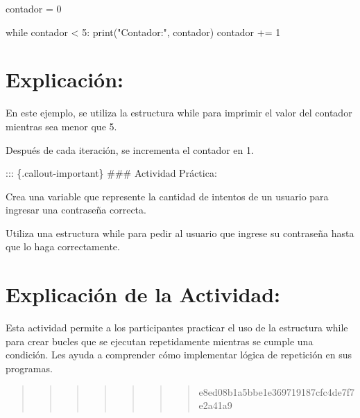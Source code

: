 \documentclass[
  a4paper,
  DIV=11,
  numbers=noendperiod,
  onepage,
  openany]{scrreprt}
\newenvironment{Shaded}{\begin{snugshade}}{\end{snugshade}}
\newcommand{\BuiltInTok}[1]{\textcolor[rgb]{0.00,0.23,0.31}{#1}}
\newcommand{\ControlFlowTok}[1]{\textcolor[rgb]{0.00,0.23,0.31}{#1}}
\newcommand{\DecValTok}[1]{\textcolor[rgb]{0.68,0.00,0.00}{#1}}
\newcommand{\NormalTok}[1]{\textcolor[rgb]{0.00,0.23,0.31}{#1}}
\newcommand{\OperatorTok}[1]{\textcolor[rgb]{0.37,0.37,0.37}{#1}}
\newcommand{\StringTok}[1]{\textcolor[rgb]{0.13,0.47,0.30}{#1}}
\begin{document}
\begin{Shaded}
\begin{Highlighting}[]
\NormalTok{contador }\OperatorTok{=} \DecValTok{0}

\ControlFlowTok{while}\NormalTok{ contador }\OperatorTok{\textless{}} \DecValTok{5}\NormalTok{:}
    \BuiltInTok{print}\NormalTok{(}\StringTok{"Contador:"}\NormalTok{, contador)}
\NormalTok{    contador }\OperatorTok{+=} \DecValTok{1}
\end{Highlighting}
\end{Shaded}

\hypertarget{explicaciuxf3n-37}{%
\section{Explicación:}\label{explicaciuxf3n-37}}

En este ejemplo, se utiliza la estructura while para imprimir el valor
del contador mientras sea menor que 5.

Después de cada iteración, se incrementa el contador en 1.

::: \{.callout-important\} \#\#\# Actividad Práctica:

Crea una variable que represente la cantidad de intentos de un usuario
para ingresar una contraseña correcta.

Utiliza una estructura while para pedir al usuario que ingrese su
contraseña hasta que lo haga correctamente.

\hypertarget{explicaciuxf3n-de-la-actividad-35}{%
\section{Explicación de la
Actividad:}\label{explicaciuxf3n-de-la-actividad-35}}

Esta actividad permite a los participantes practicar el uso de la
estructura while para crear bucles que se ejecutan repetidamente
mientras se cumple una condición. Les ayuda a comprender cómo
implementar lógica de repetición en sus programas.

\begin{quote}
\begin{quote}
\begin{quote}
\begin{quote}
\begin{quote}
\begin{quote}
\begin{quote}
e8ed08b1a5bbe1e369719187cfc4de7f7e2a41a9
\end{quote}
\end{quote}
\end{quote}
\end{quote}
\end{quote}
\end{quote}
\end{quote}
\end{document}
